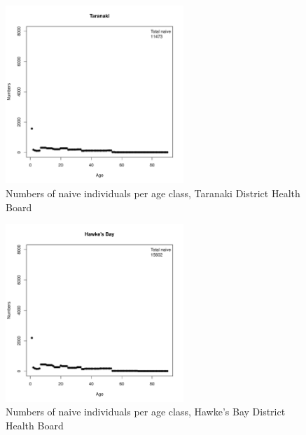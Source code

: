 \documentclass{article}
\begin{document}
\begin{figure}
     \begin{center}
     \includegraphics[width=0.6\textwidth]{dhb9.pdf}
     \end{center}
     \caption{Numbers of naive individuals per age class, Taranaki District Health Board}
     \label{fig:Taranaki}
\end{figure}

\begin{figure}
     \begin{center}
     \includegraphics[width=0.6\textwidth]{dhb10.pdf}
     \end{center}
     \caption{Numbers of naive individuals per age class, Hawke's Bay District Health Board}
     \label{fig:HawkesBay}
\end{figure}
\end{document}
